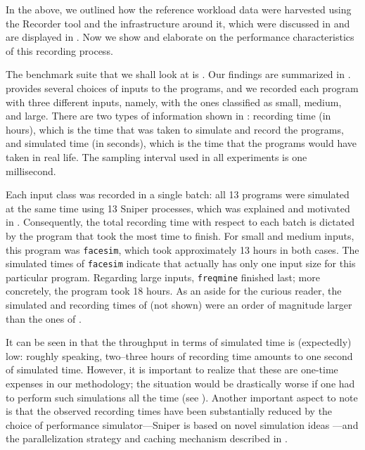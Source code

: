 
In the above, we outlined how the reference workload data were harvested using
the Recorder tool and the infrastructure around it, which were discussed in
 and are displayed in . Now we show and elaborate
on the performance characteristics of this recording process.

The benchmark suite that we shall look at is . Our findings are
summarized in .  provides several choices of inputs
to the programs, and we recorded each program with three different inputs,
namely, with the ones classified as small, medium, and large. There are two
types of information shown in : recording time (in hours), which
is the time that was taken to simulate and record the programs, and simulated
time (in seconds), which is the time that the programs would have taken in real
life. The sampling interval used in all experiments is one millisecond.

Each input class was recorded in a single batch: all 13 programs were simulated
at the same time using 13 Sniper processes, which was explained and motivated in
. Consequently, the total recording time with respect to each
batch is dictated by the program that took the most time to finish. For small
and medium inputs, this program was \texttt{facesim}, which took approximately
13 hours in both cases. The simulated times of \texttt{facesim} indicate that
 actually has only one input size for this particular program.
Regarding large inputs, \texttt{freqmine} finished last; more concretely, the
program took 18 hours. As an aside for the curious reader, the simulated and
recording times of  (not shown) were an order of magnitude
larger than the ones of .

It can be seen in  that the throughput in terms of simulated
time is (expectedly) low: roughly speaking, two--three hours of recording time
amounts to one second of simulated time. However, it is important to realize
that these are one-time expenses in our methodology; the situation would be
drastically worse if one had to perform such simulations all the time (see
). Another important aspect to note is that the observed
recording times have been substantially reduced by the choice of performance
simulator---Sniper is based on novel simulation ideas \cite{carlson2011}---and
the parallelization strategy and caching mechanism described in .
